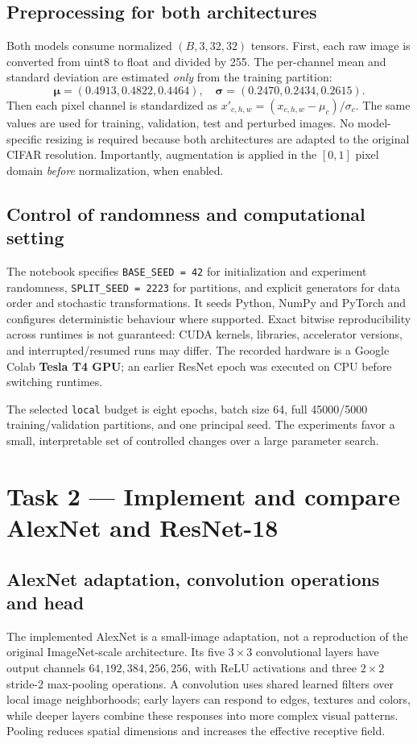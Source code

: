 \documentclass[11pt,a4paper]{article}
\begin{document}
\subsection{Preprocessing for both architectures}
Both models consume normalized $(B,3,32,32)$ tensors. First, each raw image is converted from uint8 to float and divided by 255. The per-channel mean and standard deviation are estimated \emph{only} from the training partition:
\begin{equation}
\boldsymbol{\mu}=(0.4913,0.4822,0.4464),\quad
\boldsymbol{\sigma}=(0.2470,0.2434,0.2615).
\end{equation}
Then each pixel channel is standardized as $x'_{c,h,w}=(x_{c,h,w}-\mu_c)/\sigma_c$. The same values are used for training, validation, test and perturbed images. No model-specific resizing is required because both architectures are adapted to the original CIFAR resolution. Importantly, augmentation is applied in the $[0,1]$ pixel domain \emph{before} normalization, when enabled.

\subsection{Control of randomness and computational setting}
The notebook specifies \texttt{BASE\_SEED = 42} for initialization and experiment randomness, \texttt{SPLIT\_SEED = 2223} for partitions, and explicit generators for data order and stochastic transformations. It seeds Python, NumPy and PyTorch and configures deterministic behaviour where supported. Exact bitwise reproducibility across runtimes is not guaranteed: CUDA kernels, libraries, accelerator versions, and interrupted/resumed runs may differ. The recorded hardware is a Google Colab \textbf{Tesla T4 GPU}; an earlier ResNet epoch was executed on CPU before switching runtimes.

The selected \texttt{local} budget is eight epochs, batch size 64, full \num{45000}/\num{5000} training/validation partitions, and one principal seed. The experiments favor a small, interpretable set of controlled changes over a large parameter search.

\section{Task 2 --- Implement and compare AlexNet and ResNet-18}
\subsection{AlexNet adaptation, convolution operations and head}
The implemented AlexNet is a small-image adaptation, not a reproduction of the original ImageNet-scale architecture. Its five $3\times3$ convolutional layers have output channels $64,192,384,256,256$, with ReLU activations and three $2\times2$ stride-2 max-pooling operations. A convolution uses shared learned filters over local image neighborhoods; early layers can respond to edges, textures and colors, while deeper layers combine these responses into more complex visual patterns. Pooling reduces spatial dimensions and increases the effective receptive field.
\end{document}
